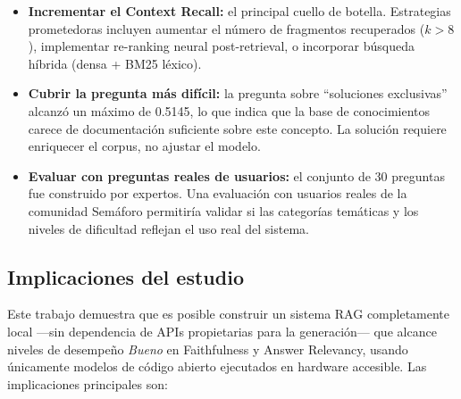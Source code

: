 \documentclass{article}
\begin{document}
\begin{itemize}
\item \textbf{Incrementar el Context Recall:} el principal cuello de botella.
  Estrategias prometedoras incluyen aumentar el número de fragmentos recuperados
  ($k > 8$), implementar re-ranking neural post-retrieval, o incorporar
  búsqueda híbrida (densa + BM25 léxico).

\item \textbf{Cubrir la pregunta más difícil:} la pregunta sobre ``soluciones
  exclusivas'' alcanzó un máximo de 0.5145, lo que indica que la base de
  conocimientos carece de documentación suficiente sobre este concepto. La
  solución requiere enriquecer el corpus, no ajustar el modelo.

\item \textbf{Evaluar con preguntas reales de usuarios:} el conjunto de 30
  preguntas fue construido por expertos. Una evaluación con usuarios reales de
  la comunidad Semáforo permitiría validar si las categorías temáticas y los
  niveles de dificultad reflejan el uso real del sistema.
\end{itemize}

\subsection{Implicaciones del estudio}

Este trabajo demuestra que es posible construir un sistema RAG completamente
local —sin dependencia de APIs propietarias para la generación— que alcance
niveles de desempeño \textit{Bueno} en Faithfulness y Answer Relevancy, usando
únicamente modelos de código abierto ejecutados en hardware accesible. Las
implicaciones principales son:
\end{document}
